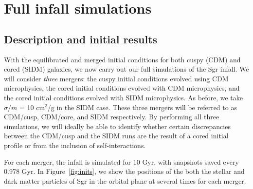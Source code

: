 \hypertarget{full-infall-simulations}{%
\chapter{Full infall simulations}\label{full-infall-simulations}}

\hypertarget{description-and-initial-results}{%
\section{Description and initial
results}\label{description-and-initial-results}}

With the equilibrated and merged initial conditions for both cuspy (CDM) and
cored (SIDM) galaxies, we now carry out our full simulations of the Sgr
infall.  We will consider \emph{three} mergers: the cuspy initial conditions
evolved using CDM microphysics, the cored initial conditions evolved with CDM
microphysics, and the cored initial conditions evolved with SIDM microphysics.
As before, we take \(\sigma / m\) = 10 cm\(^2\)/g in the SIDM case.  These
three mergers will be referred to as CDM/cusp, CDM/core, and SIDM
respectively.  By performing all three simulations, we will ideally be able to
identify whether certain discrepancies between the CDM/cusp and the SIDM runs
are the result of a cored initial profile or from the inclusion of
self-interactions.

For each merger, the infall is simulated for 10 Gyr, with snapshots saved
every 0.978 Gyr.  In Figure~\ref{fig:inits}, we show the positions of the
both the stellar and dark matter particles of Sgr in the orbital plane at
several times for each merger.

